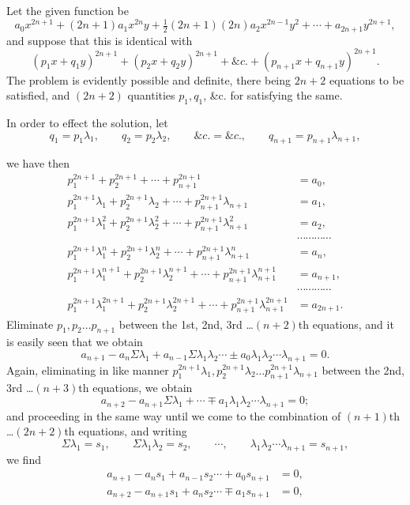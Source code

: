 \documentclass[11pt]{article}
\newcommand{\sourcepage}[1]{\marginpar{\scriptsize p.~#1}}
\begin{document}
{{Let the given function be
\[
a_0x^{2n+1}+(2n+1)a_1x^{2n}y+\tfrac12(2n+1)(2n)a_2x^{2n-1}y^2+\cdots+a_{2n+1}y^{2n+1},
\]
and suppose that this is identical with
\[
(p_1x+q_1y)^{2n+1}+(p_2x+q_2y)^{2n+1}+\&c.+(p_{n+1}x+q_{n+1}y)^{2n+1}.
\]
The problem is evidently possible and definite, there being $2n+2$ equations to be satisfied, and $(2n+2)$ quantities $p_1,q_1$, \&c. for satisfying the same.

In order to effect the solution, let
\[
q_1=p_1\lambda_1,
\qquad
q_2=p_2\lambda_2,
\qquad
\&c.=\&c.,
\qquad
q_{n+1}=p_{n+1}\lambda_{n+1},
\]

\sourcepage{266}
we have then
\[
\begin{aligned}
p_1^{2n+1}+p_2^{2n+1}+\cdots+p_{n+1}^{2n+1}&=a_0,\\
p_1^{2n+1}\lambda_1+p_2^{2n+1}\lambda_2+\cdots+p_{n+1}^{2n+1}\lambda_{n+1}&=a_1,\\
p_1^{2n+1}\lambda_1^2+p_2^{2n+1}\lambda_2^2+\cdots+p_{n+1}^{2n+1}\lambda_{n+1}^2&=a_2,\\
&\cdots\cdots\cdots\cdots\\
p_1^{2n+1}\lambda_1^n+p_2^{2n+1}\lambda_2^n+\cdots+p_{n+1}^{2n+1}\lambda_{n+1}^n&=a_n,\\
p_1^{2n+1}\lambda_1^{n+1}+p_2^{2n+1}\lambda_2^{n+1}+\cdots+p_{n+1}^{2n+1}\lambda_{n+1}^{n+1}&=a_{n+1},\\
&\cdots\cdots\cdots\cdots\\
p_1^{2n+1}\lambda_1^{2n+1}+p_2^{2n+1}\lambda_2^{2n+1}+\cdots+p_{n+1}^{2n+1}\lambda_{n+1}^{2n+1}&=a_{2n+1}.
\end{aligned}
\]
Eliminate $p_1,p_2\ldots p_{n+1}$ between the 1st, 2nd, 3rd \ldots $(n+2)$th equations, and it is easily seen that we obtain
\[
a_{n+1}-a_n\Sigma\lambda_1+a_{n-1}\Sigma\lambda_1\lambda_2\cdots\pm a_0\lambda_1\lambda_2\cdots\lambda_{n+1}=0.
\]
Again, eliminating in like manner $p_1^{2n+1}\lambda_1,p_2^{2n+1}\lambda_2\ldots p_{n+1}^{2n+1}\lambda_{n+1}$ between the 2nd, 3rd \ldots $(n+3)$th equations, we obtain
\[
a_{n+2}-a_{n+1}\Sigma\lambda_1+\cdots\mp a_1\lambda_1\lambda_2\cdots\lambda_{n+1}=0;
\]
and proceeding in the same way until we come to the combination of $(n+1)$th \ldots $(2n+2)$th equations, and writing
\[
\Sigma\lambda_1=s_1,
\qquad
\Sigma\lambda_1\lambda_2=s_2,
\qquad
\cdots,
\qquad
\lambda_1\lambda_2\cdots\lambda_{n+1}=s_{n+1},
\]
we find
\[
\begin{aligned}
a_{n+1}-a_ns_1+a_{n-1}s_2\cdots+a_0s_{n+1}&=0,\\
a_{n+2}-a_{n+1}s_1+a_ns_2\cdots\mp a_1s_{n+1}&=0,\\

\end{aligned}\]}}
\end{document}
